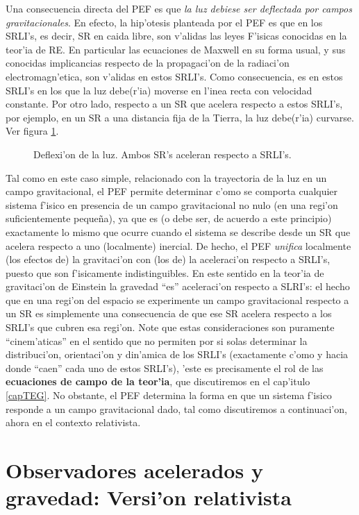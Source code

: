 Una consecuencia directa del PEF es que \textit{la luz debiese ser deflectada por campos gravitacionales}. En efecto, la hip'otesis planteada por el PEF es que en los SRLI's, es decir, SR en caida libre, son v'alidas las leyes F'isicas conocidas en la teor'ia de RE. En particular las ecuaciones de Maxwell en su forma usual, y sus conocidas implicancias respecto de la propagaci'on de la radiaci'on electromagn'etica, son v'alidas en estos SRLI's. Como consecuencia, es en estos SRLI's en los que la luz debe(r'ia) moverse en l'inea recta con velocidad constante. 
 Por otro lado, respecto a un SR que acelera respecto a estos SRLI's, por ejemplo, en un SR a una distancia fija de la Tierra, la luz debe(r'ia) curvarse. Ver figura \ref{fig:PEF-luz}.
\begin{figure}[H]
\centering{}
\caption{Deflexi'on de la luz. Ambos SR's aceleran respecto a SRLI's.}
\label{fig:PEF-luz}
\end{figure}
Tal como en este caso simple, relacionado con la trayectoria de la luz en un campo gravitacional, el PEF permite determinar c'omo se comporta cualquier sistema f'isico en presencia de un campo gravitacional no nulo (en una regi'on suficientemente peque\~na), ya que es (o debe ser, de acuerdo a este principio) exactamente lo mismo que ocurre cuando el sistema se describe desde un SR que acelera respecto a uno (localmente) inercial. De hecho, el PEF \textit{unifica} localmente (los efectos de) la gravitaci'on con (los de) la aceleraci'on respecto a SRLI's, puesto que son f'isicamente indistinguibles. En este sentido en la teor'ia de gravitaci'on de Einstein la gravedad ``es'' aceleraci'on respecto a SLRI's: el hecho que en una regi'on del espacio se experimente un campo gravitacional respecto a un SR es simplemente una consecuencia de que ese SR acelera respecto a los SRLI's que cubren esa regi'on. Note que estas consideraciones son puramente ``cinem'aticas'' en el sentido que no permiten por si solas determinar la distribuci'on, orientaci'on y din'amica de los SRLI's (exactamente c'omo y hacia donde ``caen'' cada uno de estos SRLI's), 'este es precisamente el rol de las \textbf{ecuaciones de campo de la teor'ia}, que discutiremos en el cap'itulo \ref{capTEG}. No obstante, el PEF determina la forma en que un sistema f'isico responde a un campo gravitacional dado, tal como discutiremos a continuaci'on, ahora en el contexto relativista.

\section{Observadores acelerados y gravedad: Versi'on  relativista}

